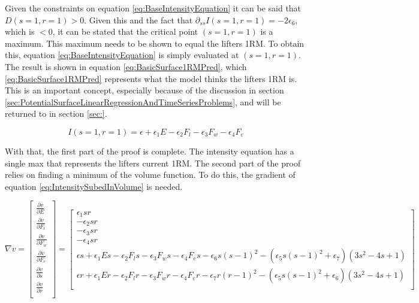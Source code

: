 Given the constraints on equation \ref{eq:BaseIntensityEquation} it can be said that $D(s=1,r=1)>0$. Given this and the fact that $\partial_{ss}I(s=1,r=1)=-2\epsilon_6$, which is $<0$, it can be stated that the critical point $(s=1,r=1)$ is a maximum. This maximum needs to be shown to equal the lifters 1RM. To obtain this, equation \ref{eq:BaseIntensityEquation} is simply evaluated at $(s=1,r=1)$. The result is shown in equation \ref{eq:BasicSurface1RMPred}, which \ref{eq:BasicSurface1RMPred} represents what the model thinks the lifters 1RM is. This is an important concept, especially because of the discussion in section \ref{sec:PotentialSurfaceLinearRegressionAndTimeSeriesProblems}, and will be returned to in section \ref{sec:}.

\begin{equation}
	\label{eq:BasicSurface1RMPred}
	I(s=1,r=1)=\epsilon+
    		\epsilon_1 E-
    		\epsilon_2 F_l-
    		\epsilon_3 F_w-
    		\epsilon_4 F_e
\end{equation}

With that, the first part of the proof is complete. The intensity equation has a single max that represents the lifters current 1RM. The second part of the proof relies on finding a minimum of the volume function. To do this, the gradient of equation \ref{eq:IntensitySubedInVolume} is needed.

\begin{equation*}
	\nabla v=\left[\begin{matrix}
		\frac{\partial v}{\partial E} \\
		\frac{\partial v}{\partial F_l} \\
		\frac{\partial v}{\partial F_w} \\
		\frac{\partial v}{\partial F_e} \\
		\frac{\partial v}{\partial s} \\
		\frac{\partial v}{\partial r} \\
	\end{matrix}\right]=
	\left[\begin{matrix}
		\epsilon_1 sr \\
		-\epsilon_2 sr \\
		-\epsilon_3 sr \\
		-\epsilon_4 sr \\
		\epsilon s+
		\epsilon_1 Es-
		\epsilon_2 F_l s-
		\epsilon_3 F_w s-
		\epsilon_4 F_e s-
		\epsilon_6 s(s-1)^2	-
		\left( 
			\epsilon_5 s(s-1)^2+\epsilon_7
		\right)	
		(3s^2-4s+1) \\
		\epsilon r+
		\epsilon_1 Er-
		\epsilon_2 F_l r-
		\epsilon_3 F_w r-
		\epsilon_4 F_e r-
		\epsilon_7 r(r-1)^2	-
		\left( 
			\epsilon_5 s(s-1)^2+\epsilon_6
		\right)	
		(3s^2-4s+1) \\
	\end{matrix}\right]
\end{equation*}

